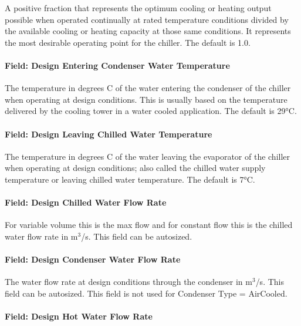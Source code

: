 A positive fraction that represents the optimum cooling or heating output possible when operated continually at rated temperature conditions divided by the available cooling or heating capacity at those same conditions. It represents the most desirable operating point for the chiller. The default is 1.0.

\paragraph{Field: Design Entering Condenser Water Temperature}\label{field-design-entering-condenser-water-temperature-1}

The temperature in degrees C of the water entering the condenser of the chiller when operating at design conditions. This is usually based on the temperature delivered by the cooling tower in a water cooled application. The default is 29°C.

\paragraph{Field: Design Leaving Chilled Water Temperature}\label{field-design-leaving-chilled-water-temperature-1}

The temperature in degrees C of the water leaving the evaporator of the chiller when operating at design conditions; also called the chilled water supply temperature or leaving chilled water temperature. The default is 7°C.

\paragraph{Field: Design Chilled Water Flow Rate}\label{field-design-chilled-water-flow-rate-7}

For variable volume this is the max flow and for constant flow this is the chilled water flow rate in m\(^{3}\)/s. This field can be autosized.

\paragraph{Field: Design Condenser Water Flow Rate}\label{field-design-condenser-water-flow-rate-6}

The water flow rate at design conditions through the condenser in m\(^{3}\)/s. This field can be autosized. This field is not used for Condenser Type = AirCooled.

\paragraph{Field: Design Hot Water Flow Rate}\label{field-design-hot-water-flow-rate-1}

